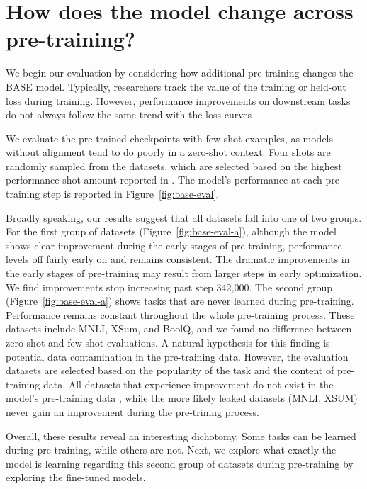 




\section{How does the model change across pre-training?}

\label{sec:finding:base-eval}
We begin our evaluation by considering how additional pre-training changes the BASE model. Typically, researchers track the value of the training or held-out loss during training. 
However, performance improvements on downstream tasks do not always follow the same trend with the loss curves \cite{groeneveld2024olmo}.

We evaluate the pre-trained checkpoints with few-shot examples, as models without alignment tend to do poorly in a zero-shot context.
Four shots are randomly sampled from the datasets, which are selected based on the highest performance shot amount reported in \citealp{yang2024unveiling}. 
The model's performance at each pre-training step is reported in Figure~\ref{fig:base-eval}.

Broadly speaking, our results suggest that all datasets fall into one of two groups. 
For the first group of datasets (Figure~\ref{fig:base-eval-a}), although the model shows clear improvement during the early stages of pre-training, performance levels off fairly early on and remains consistent. The dramatic improvements in the early stages of pre-training may result from larger steps in early optimization.
We find improvements stop increasing past step 342,000.
The second group (Figure~\ref{fig:base-eval-a}) shows tasks that are never learned during pre-training. 
Performance remains constant throughout the whole pre-training process. 
These datasets include MNLI, XSum, and BoolQ, and we found no difference between zero-shot and few-shot evaluations.
A natural hypothesis for this finding is potential data contamination in the pre-training data.
However, the evaluation datasets are selected based on the popularity of the task and the content of pre-training data. 
All datasets that experience improvement do not exist in the model's pre-training data \cite{soldaini2024dolma}, while the more likely leaked datasets (MNLI, XSUM) never gain an improvement during the pre-trining process.

Overall, these results reveal an interesting dichotomy. 
Some tasks can be learned during pre-training, while others are not. 
Next, we explore what exactly the model is learning regarding this second group of datasets during pre-training by exploring the fine-tuned models.

